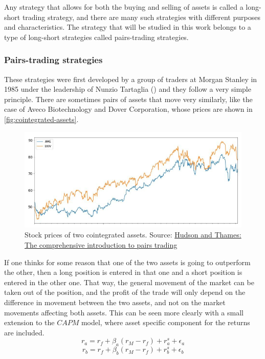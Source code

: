 Any strategy that allows for both the buying and selling of assets is called a long-short trading strategy, and there are many such strategies with different purposes and characteristics. The strategy that will be studied in this work belongs to a type of long-short strategies called pairs-trading strategies.

\subsubsection{Pairs-trading strategies}
These strategies were first developed by a group of traders at Morgan Stanley in 1985 under the leadership of Nunzio Tartaglia (\cite{pole_2011}) and they follow a very simple principle. There are sometimes pairs of assets that move very similarly, like the case of Aveco Biotechnology and Dover Corporation, whose prices are shown in \autoref{fig:cointegrated-assets}.

\begin{figure}[h]
    \captionsetup{justification=centering}
    \includegraphics[width=\linewidth]{assets/cointegrated-assets.png}
    \caption{Stock prices of two cointegrated assets. Source: \href{https://hudsonthames.org/definitive-guide-to-pairs-trading/}{Hudson and Thames: The comprehensive introduction to pairs trading}}
    \label{fig:cointegrated-assets}
\end{figure}

If one thinks for some reason that one of the two assets is going to outperform the other, then a long position is entered in that one and a short position is entered in the other one. That way, the general movement of the market can be taken out of the position, and the profit of the trade will only depend on the difference in movement between the two assets, and not on the market movements affecting both assets. 
This can be seen more clearly with a small extension to the $CAPM$ model, where asset specific component for the returns are included.
\begin{equation}
    r_a=r_f+\beta_a(r_M-r_f)+ r_a^s+ \epsilon_a
\end{equation}
\begin{equation}
    r_b=r_f+\beta_b(r_M-r_f)+ r_b^s+ \epsilon_b
\end{equation}


